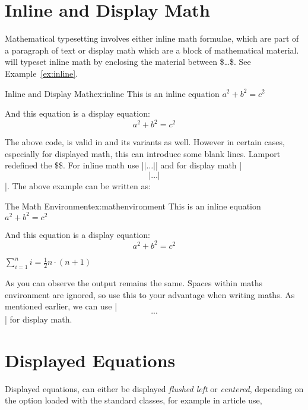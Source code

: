 \pagestyle{headings}
\normalfont

\section{Inline and Display Math}
Mathematical typesetting involves either inline math formulae, which are part of a paragraph of text or display math which are a block of mathematical material. \tex will typeset inline math by enclosing the material between  \$\ldots\$. See Example~\ref{ex:inline}.
\bigskip

\begin{texexample}[]{Inline and Display Math}{ex:inline}
This is an inline equation \(a^2+b^2=c^2\)

And this equation is a display equation:
\[a^2+b^2=c^2\]
\end{texexample}


The above code, is valid in \latex and its variants as well. However in certain cases, especially for displayed math, this can introduce some blank lines. Lamport redefined
the \$\$. For inline math use |\(|\ldots|\)| and for display math |\[|\ldots|\] |. The above example can be written as:
\bigskip

\begin{texexample}{The Math Environment}{ex:mathenvironment}
 This is an inline equation \(a^2+b^2=c^2\)

 And this equation is a display equation:
 \[a^2+b^2=c^2\]

 \begin{math}
 \sum_{i=1}^{n}i=\frac{1}{2}n\cdot(n+1)
 \end{math}
\end{texexample}



As you can observe the output remains the same.  Spaces within  maths environment are ignored, so use this to your advantage when writing maths. As mentioned earlier, we can use |\[...\]| for display math.


\section{Displayed Equations}


Displayed equations, can either be displayed \emph{flushed left} or \emph{centered}, depending on the option loaded with the standard classes, for example in article use,


